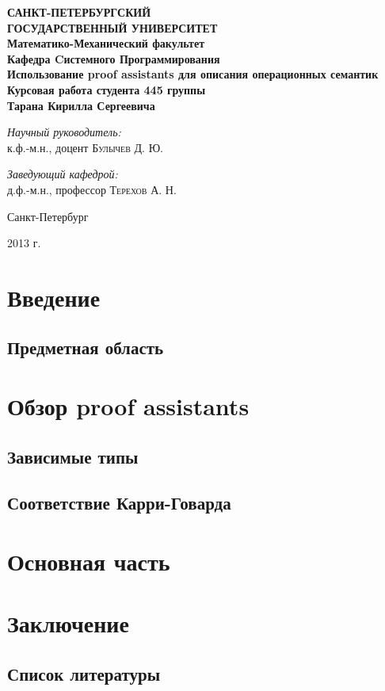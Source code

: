 \documentclass[aps,12pt,final,oneside,onecolumn,musixtex,superscriptaddress,centertags]{article}
\begin{document}
  \begin{titlepage} 
     \begin{center}
        \textbf{\Large САНКТ-ПЕТЕРБУРГСКИЙ \\ ГОСУДАРСТВЕННЫЙ УНИВЕРСИТЕТ} \\[1.0cm]
        \textbf{\large Математико-Механический факультет} \\[0.2cm]
        \textbf{\large Кафедра Cистемного Программирования}\\[3.5cm]

        \textbf{\LARGE Использование proof assistants для описания операционных семантик}\\[1.0cm]
        \textbf{\Large Курсовая работа студента 445 группы} \\[0.2cm]
        \textbf{\Large Тарана Кирилла Сергеевича} \\[3.5cm]

        \begin{flushright} \large \emph{Научный руководитель:} \\ к.ф.-м.н., доцент    \textsc{Булычев Д. Ю.} \end{flushright}
        \begin{flushright} \large \emph{Заведующий кафедрой:}  \\ д.ф.-м.н., профессор \textsc{Терехов А. Н.} \end{flushright}
        \vfill 

        {\large {Санкт-Петербург}} \par
        {\large {2013 г.}}
     \end{center} 
  \end{titlepage}

  \tableofcontents
  \newpage

  \section{Введение}
  \subsection{Предметная область}
  \section{Обзор proof assistants}
  \subsection{Зависимые типы}
  \subsection{Соответствие Карри-Говарда}
  \section{Основная часть}
  \section{Заключение}

  \cite{Bove:2009:DTW:1614478.1614480}

  \subsection{Список литературы}
  
  
\end{document}
